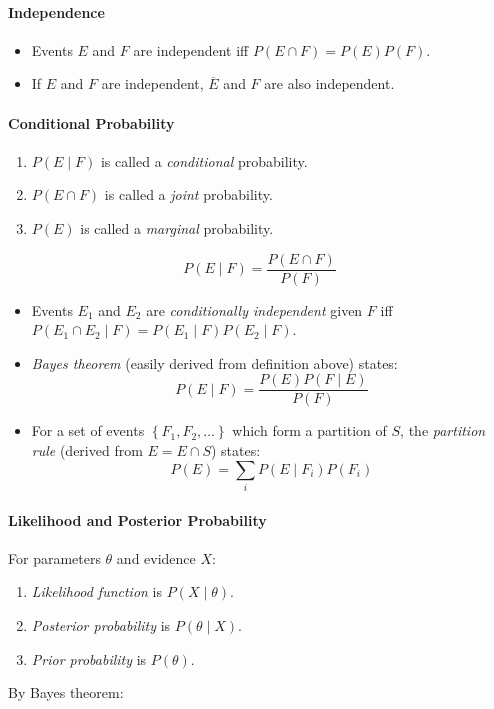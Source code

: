 \documentclass[twocolumn,english]{article}
\begin{document}
\paragraph{Independence}
\begin{itemize}
\item Events $E$ and $F$ are independent iff $P\left(E\cap F\right)=P\left(E\right)P\left(F\right)$.
\item If $E$ and $F$ are independent, $\overline{E}$ and $F$ are also
independent.
\end{itemize}

\paragraph{Conditional Probability}
\begin{enumerate}
\item $P\left(E\mid F\right)$ is called a \emph{conditional} probability.
\item $P\left(E\cap F\right)$ is called a \emph{joint} probability.
\item $P\left(E\right)$ is called a \emph{marginal} probability.
\end{enumerate}
\[
P\left(E\mid F\right)=\frac{P\left(E\cap F\right)}{P\left(F\right)}
\]
\begin{itemize}
\item Events $E_{1}$ and $E_{2}$ are \emph{conditionally independent}
given $F$ iff $P\left(E_{1}\cap E_{2}\mid F\right)=P\left(E_{1}\mid F\right)P\left(E_{2}\mid F\right)$.
\item \emph{Bayes theorem} (easily derived from definition above) states:
\[
P\left(E\mid F\right)=\frac{P\left(E\right)P(F\mid E)}{P\left(F\right)}
\]
\item For a set of events $\left\{ F_{1},F_{2},\dots\right\} $ which form
a partition of $S$, the \emph{partition rule} (derived from $E=E\cap S$)
states:
\[
P\left(E\right)=\sum_{i}P\left(E\mid F_{i}\right)P\left(F_{i}\right)
\]
\end{itemize}

\paragraph{Likelihood and Posterior Probability}

For parameters $\theta$ and evidence $X$:
\begin{enumerate}
\item \emph{Likelihood function} is $P\left(X\mid\theta\right)$.
\item \emph{Posterior probability} is $P\left(\theta\mid X\right)$.
\item \emph{Prior probability} is $P\left(\theta\right)$.
\end{enumerate}
By Bayes theorem:
\end{document}
